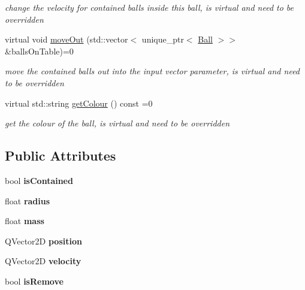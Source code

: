 \begin{DoxyCompactItemize}
\begin{DoxyCompactList}\small\item\em change the velocity for contained balls inside this ball, is virtual and need to be overridden \end{DoxyCompactList}\item 
virtual void \mbox{\hyperlink{class_ball_a7d3b8c70ee8c61db73692a4d44bbf933}{move\+Out}} (std\+::vector$<$ unique\+\_\+ptr$<$ \mbox{\hyperlink{class_ball}{Ball}} $>$$>$ \&balls\+On\+Table)=0
\begin{DoxyCompactList}\small\item\em move the contained balls out into the input vector parameter, is virtual and need to be overridden \end{DoxyCompactList}\item 
virtual std\+::string \mbox{\hyperlink{class_ball_a248c8a5fc9b8770840f275ea7057b012}{get\+Colour}} () const =0
\begin{DoxyCompactList}\small\item\em get the colour of the ball, is virtual and need to be overridden \end{DoxyCompactList}\end{DoxyCompactItemize}
\subsection*{Public Attributes}
\begin{DoxyCompactItemize}
\item 
\mbox{\label{class_ball_af9ccb63ad19e4073c1de2aadbcaaf542}} 
bool {\bfseries is\+Contained}
\item 
\mbox{\label{class_ball_a86bfb032007c736e06c2295a8070d620}} 
float {\bfseries radius}
\item 
\mbox{\label{class_ball_a7d4dece3bb0e321f1739917ce8ff6297}} 
float {\bfseries mass}
\item 
\mbox{\label{class_ball_af732a08aa15b235e44d30ca7a258f2be}} 
Q\+Vector2D {\bfseries position}
\item 
\mbox{\label{class_ball_ad97aed858907a22482f53e5b623eaf6a}} 
Q\+Vector2D {\bfseries velocity}
\item 
\mbox{\label{class_ball_ad50c5d8887de16a94113760871279743}} 
bool {\bfseries is\+Remove}
\end{DoxyCompactItemize}


